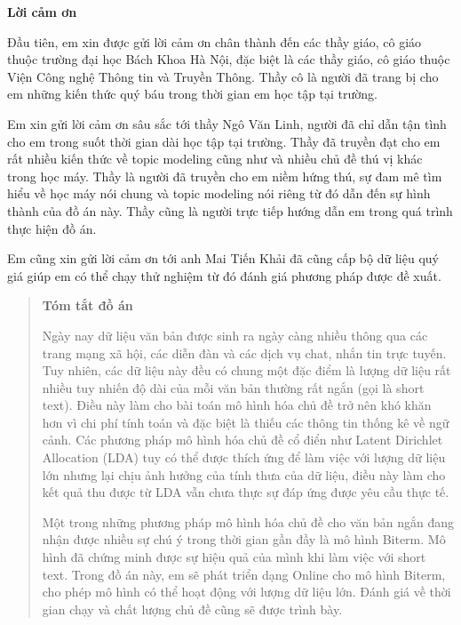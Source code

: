 \documentclass[fontsize=13pt]{scrartcl}
\begin{document}
\newpage
\begin{center}
\textbf{Lời cảm ơn}
\end{center}
Đầu tiên, em xin được gửi lời cảm ơn chân thành đến các thầy giáo, cô giáo thuộc trường đại học Bách Khoa Hà Nội, đặc biệt là các thầy giáo, cô giáo thuộc Viện Công nghệ Thông tin và Truyền Thông. Thầy cô là người đã trang bị cho em những kiến thức quý báu trong thời gian em học tập tại trường.
\par
Em xin gửi lời cảm ơn sâu sắc tới thầy Ngô Văn Linh, người đã chỉ dẫn tận tình cho em trong suốt thời gian dài học tập tại trường. Thầy đã truyền đạt cho em rất nhiều kiến thức về topic modeling cũng như và nhiều chủ đề thú vị khác trong học máy. Thầy là người đã truyền cho em niềm hứng thú, sự đam mê tìm hiểu về học máy nói chung và topic modeling nói riêng từ đó dẫn đến sự hình thành của đồ án này. Thầy cũng là người trực tiếp hướng dẫn em trong quá trình thực hiện đồ án.
\par 

Em cũng xin gửi lời cảm ơn tới anh Mai Tiến Khải đã cũng cấp bộ dữ liệu quý giá giúp em có thể chạy thử nghiệm từ đó đánh giá phương pháp được đề xuất.

\newpage
\begin{abstract}
\begin{center}
\textbf{Tóm tắt đồ án}
\end{center}
Ngày nay dữ liệu văn bản được sinh ra ngày càng nhiều thông qua các trang mạng xã hội, các diễn đàn và các dịch vụ chat, nhắn tin trực tuyến. Tuy nhiên, các dữ liệu này đều có chung một đặc điểm là lượng dữ liệu rất nhiều tuy nhiến độ dài của mỗi văn bản thường rất ngắn (gọi là short text). Điều này làm cho bài toán mô hình hóa chủ đề trở nên khó khăn hơn vì chi phí tính toán và đặc biệt là thiếu các thông tin thống kê về ngữ cảnh. Các phương pháp mô hình hóa chủ đề cổ điển như Latent Dirichlet Allocation (LDA) tuy có thể được thích ứng để làm việc với lượng dữ liệu lớn nhưng lại chịu ảnh hưởng của tính thưa của dữ liệu, điều này làm cho kết quả thu được từ LDA vẫn chưa thực sự đáp ứng được yêu cầu thực tế.
\par

Một trong những phương pháp mô hình hóa chủ đề cho văn bản ngắn đang nhận được nhiều sự chú ý trong thời gian gần đầy là mô hình Biterm. Mô hình đã chứng minh được sự hiệu quả của mình khi làm việc với short text. Trong đồ án này, em sẽ phát triển dạng Online cho mô hình Biterm, cho phép mô hình có thể hoạt động với lượng dữ liệu lớn. Đánh giá về thời gian chạy và chất lượng chủ đề cũng sẽ được trình bày.
\end{abstract}
\end{document}
